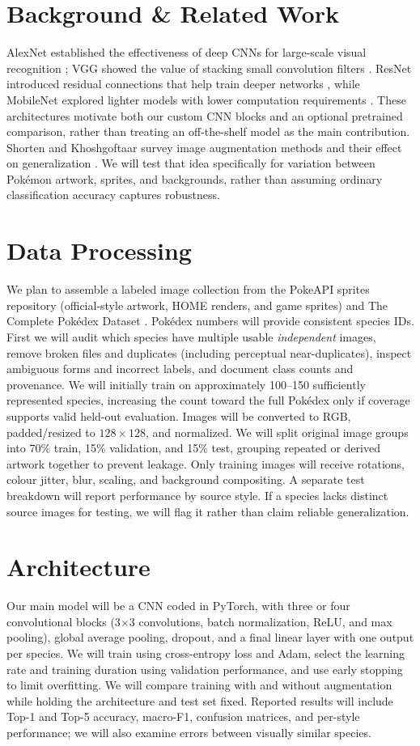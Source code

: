 \documentclass[final]{article}
\begin{document}
\section*{Background \& Related Work}
AlexNet established the effectiveness of deep CNNs for large-scale visual recognition \citep{krizhevsky2012}; VGG showed the value of stacking small convolution filters \citep{simonyan2015}. ResNet introduced residual connections that help train deeper networks \citep{he2016}, while MobileNet explored lighter models with lower computation requirements \citep{howard2017}. These architectures motivate both our custom CNN blocks and an optional pretrained comparison, rather than treating an off-the-shelf model as the main contribution. Shorten and Khoshgoftaar survey image augmentation methods and their effect on generalization \citep{shorten2019}. We will test that idea specifically for variation between Pok\'emon artwork, sprites, and backgrounds, rather than assuming ordinary classification accuracy captures robustness.
\section*{Data Processing}
We plan to assemble a labeled image collection from the PokeAPI sprites repository (official-style artwork, HOME renders, and game sprites) \citep{pokeapiSprites} and The Complete Pok\'edex Dataset \citep{mitchellPokedex}. Pok\'edex numbers will provide consistent species IDs. First we will audit which species have multiple usable \emph{independent} images, remove broken files and duplicates (including perceptual near-duplicates), inspect ambiguous forms and incorrect labels, and document class counts and provenance. We will initially train on approximately 100--150 sufficiently represented species, increasing the count toward the full Pok\'edex only if coverage supports valid held-out evaluation. Images will be converted to RGB, padded/resized to $128\times128$, and normalized. We will split original image groups into 70\% train, 15\% validation, and 15\% test, grouping repeated or derived artwork together to prevent leakage. Only training images will receive rotations, colour jitter, blur, scaling, and background compositing. A separate test breakdown will report performance by source style. If a species lacks distinct source images for testing, we will flag it rather than claim reliable generalization.
\section*{Architecture}
Our main model will be a CNN coded in PyTorch, with three or four convolutional blocks (3$\times$3 convolutions, batch normalization, ReLU, and max pooling), global average pooling, dropout, and a final linear layer with one output per species. We will train using cross-entropy loss and Adam, select the learning rate and training duration using validation performance, and use early stopping to limit overfitting. We will compare training with and without augmentation while holding the architecture and test set fixed. Reported results will include Top-1 and Top-5 accuracy, macro-F1, confusion matrices, and per-style performance; we will also examine errors between visually similar species.
\end{document}
